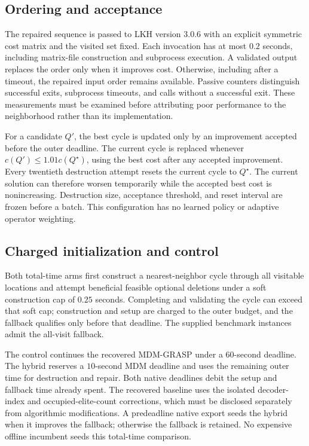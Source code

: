 
\subsection{Ordering and acceptance}
The repaired sequence is passed to LKH version 3.0.6 with an explicit
symmetric cost matrix and the visited set fixed. Each invocation has at most
$0.2$ seconds, including matrix-file construction and subprocess execution.
A validated output replaces the order only when it improves cost. Otherwise,
including after a timeout, the repaired input order remains available.
Passive counters distinguish successful exits, subprocess timeouts, and
calls without a successful exit. These measurements must be examined before
attributing poor performance to the neighborhood rather than its implementation.

For a candidate $Q'$, the best cycle is updated only by an improvement
accepted before the outer deadline. The current cycle is replaced whenever
$c(Q')\le1.01c(Q^\star)$, using the best cost after any accepted improvement.
Every twentieth destruction attempt resets the current cycle to $Q^\star$.
The current solution can therefore worsen temporarily while the accepted
best cost is nonincreasing. Destruction size, acceptance threshold, and reset
interval are frozen before a batch. This configuration has no learned policy
or adaptive operator weighting.

\subsection{Charged initialization and control}
Both total-time arms first construct a nearest-neighbor cycle through all
visitable locations and attempt beneficial feasible optional deletions under
a soft construction cap of $0.25$ seconds. Completing and validating the
cycle can exceed that soft cap; construction and setup are charged to the
outer budget, and the fallback qualifies only before that deadline. The
supplied benchmark instances admit the all-visit fallback.

The control continues the recovered MDM-GRASP under a $60$-second deadline.
The hybrid reserves a $10$-second MDM deadline and uses the remaining outer
time for destruction and repair. Both native deadlines debit the setup and
fallback time already spent. The recovered baseline uses the isolated
decoder-index and occupied-elite-count corrections, which must be disclosed
separately from algorithmic modifications. A predeadline native export seeds
the hybrid when it improves the fallback; otherwise the fallback is retained.
No expensive offline incumbent seeds this total-time comparison.

